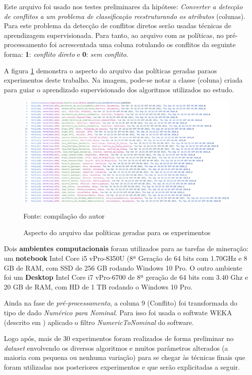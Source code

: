 Este arquivo foi usado nos testes preliminares da hipótese:  \textit{Converter a detecção de conflitos a um problema de classificação reestruturando os atributos} (colunas). Para este problema da detecção de conflitos diretos serão usadas técnicas de aprendizagem supervisionada. Para tanto, ao arquivo com as políticas, no pré-processamento foi acrescentada uma coluna rotulando os conflitos da seguinte forma: \textbf{1}: \textit{conflito direto} e \textbf{0}: \textit{sem conflito}.

A figura \ref{fig:aspecto_arquivo} demonstra o aspecto do arquivo das políticas geradas paraos experimentos deste trabalho. Na imagem, pode-se notar a classe (coluna) criada para guiar o aprendizado supervisionado dos algoritmos utilizados no estudo.

\begin{figure}[h!]
	\centering
	\includegraphics[width=.8\textwidth]{imagens/aspecto_arquivo_politicas.png}	
	\caption{Aspecto do arquivo das políticas geradas para os experimentos}
	\label{fig:aspecto_arquivo}
	{\scriptsize Fonte: compilação do autor}
\end{figure}

Dois \textbf{ambientes computacionais} foram utilizados para as tarefas de mineração: 
um \textbf{notebook}  Intel Core i5 vPro-8350U (8ª Geração de 64 bits com 1.70GHz e 8 GB de RAM, com SSD de 256 GB rodando Windows 10 Pro. 
O outro ambiente foi um \textbf{Desktop} Intel Core i7 vPro-6700 de 8ª geração de 64 bits com 3.40 Ghz e 20 GB de RAM, com HD de 1 TB rodando o Windows 10 Pro.

Ainda na fase de \textit{pré-processamento}, a coluna 9 (Conflito) foi transformada do tipo de dado \textit{Numérico para Nominal}. Para isso foi usada o softwate WEKA (descrito em \cite{eibe2016}) aplicado o filtro \textit{NumericToNominal} do software.

Logo após, mais de 30 experimentos foram realizados de forma preliminar no \textit{dataset} envolvendo os diversos algoritmos e muitos parâmetros alterados (a maioria com pequena ou nenhuma variação) para se chegar às técnicas finais que foram utilizadas nos posteriores experimentos e que serão explicitadas a seguir.

